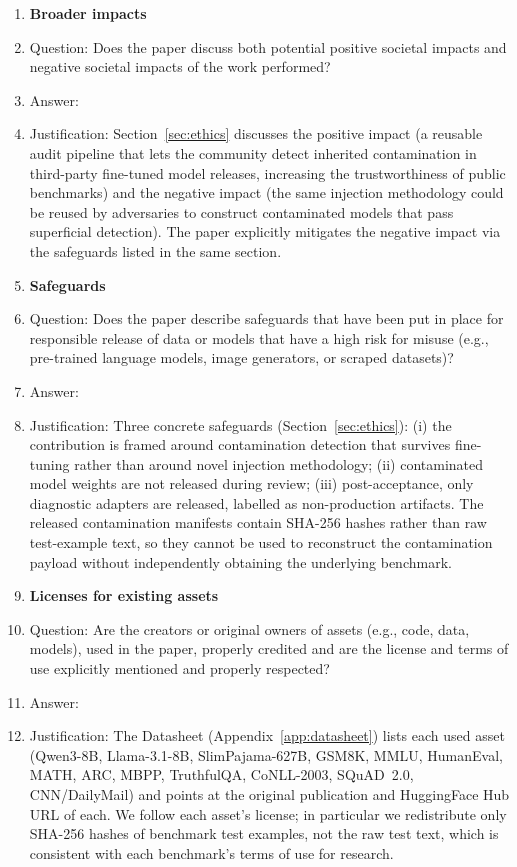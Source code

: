\begin{enumerate}
\item {\bf Broader impacts}
    \item[] Question: Does the paper discuss both potential positive societal impacts and negative societal impacts of the work performed?
    \item[] Answer: \answerYes{}
    \item[] Justification: Section~\ref{sec:ethics} discusses the positive impact (a reusable audit pipeline that lets the community detect inherited contamination in third-party fine-tuned model releases, increasing the trustworthiness of public benchmarks) and the negative impact (the same injection methodology could be reused by adversaries to construct contaminated models that pass superficial detection). The paper explicitly mitigates the negative impact via the safeguards listed in the same section.

\item {\bf Safeguards}
    \item[] Question: Does the paper describe safeguards that have been put in place for responsible release of data or models that have a high risk for misuse (e.g., pre-trained language models, image generators, or scraped datasets)?
    \item[] Answer: \answerYes{}
    \item[] Justification: Three concrete safeguards (Section~\ref{sec:ethics}): (i) the contribution is framed around contamination detection that survives fine-tuning rather than around novel injection methodology; (ii) contaminated model weights are not released during review; (iii) post-acceptance, only diagnostic adapters are released, labelled as non-production artifacts. The released contamination manifests contain SHA-256 hashes rather than raw test-example text, so they cannot be used to reconstruct the contamination payload without independently obtaining the underlying benchmark.

\item {\bf Licenses for existing assets}
    \item[] Question: Are the creators or original owners of assets (e.g., code, data, models), used in the paper, properly credited and are the license and terms of use explicitly mentioned and properly respected?
    \item[] Answer: \answerYes{}
    \item[] Justification: The Datasheet (Appendix~\ref{app:datasheet}) lists each used asset (Qwen3-8B, Llama-3.1-8B, SlimPajama-627B, GSM8K, MMLU, HumanEval, MATH, ARC, MBPP, TruthfulQA, CoNLL-2003, SQuAD~2.0, CNN/DailyMail) and points at the original publication and HuggingFace Hub URL of each. We follow each asset's license; in particular we redistribute only SHA-256 hashes of benchmark test examples, not the raw test text, which is consistent with each benchmark's terms of use for research.


\end{enumerate}
